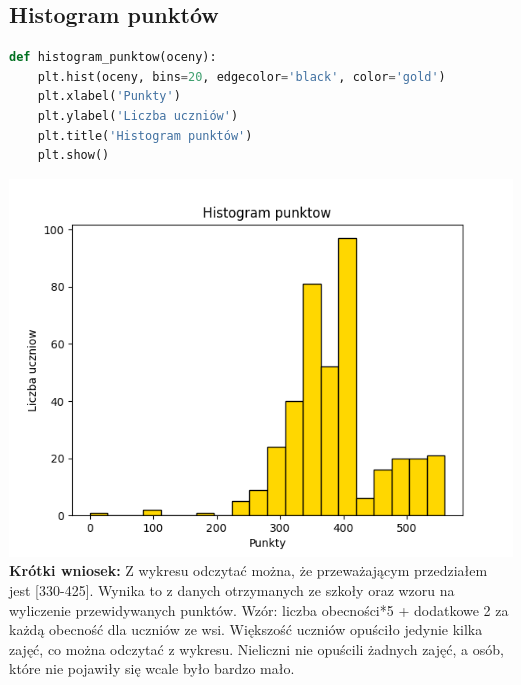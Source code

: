 \documentclass{article}
\begin{document}
\subsection{Histogram punktów}
\begin{lstlisting}[language=Python]
def histogram_punktow(oceny):
    plt.hist(oceny, bins=20, edgecolor='black', color='gold')
    plt.xlabel('Punkty')
    plt.ylabel('Liczba uczniów')
    plt.title('Histogram punktów')
    plt.show()
\end{lstlisting}
\includegraphics[width=\textwidth]{histogram_punktow.png}
\textbf{Krótki wniosek:} Z wykresu odczytać można, że przeważającym przedziałem jest [330-425]. Wynika to z danych otrzymanych ze szkoły oraz wzoru na wyliczenie przewidywanych punktów. Wzór: liczba obecności*5 + dodatkowe 2 za każdą obecność dla uczniów ze wsi. Większość uczniów opuściło jedynie kilka zajęć, co można odczytać z wykresu. Nieliczni nie opuścili żadnych zajęć, a osób, które nie pojawiły się wcale było bardzo mało.
\vspace{15cm}
\end{document}
